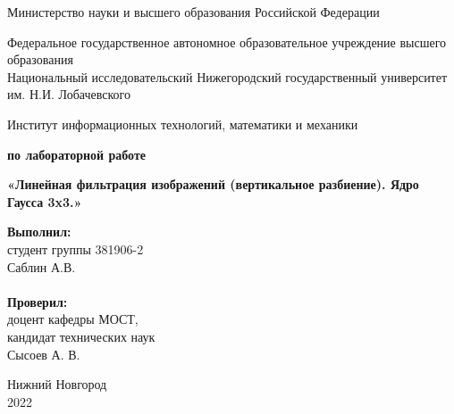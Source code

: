 \documentclass{report}
\begin{document}
\begin{titlepage}

\begin{center}
Министерство науки и высшего образования Российской Федерации
\end{center}

\begin{center}
Федеральное государственное автономное образовательное учреждение высшего образования \\
Национальный исследовательский Нижегородский государственный университет им. Н.И. Лобачевского
\end{center}

\begin{center}
Институт информационных технологий, математики и механики
\end{center}

\vspace{4em}

\begin{center}
\textbf{ по лабораторной работе} \\
\end{center}
\begin{center}
\textbf{\Large«Линейная фильтрация изображений (вертикальное разбиение). Ядро Гаусса 3x3.»} \\
\end{center}

\vspace{4em}

\newbox{\lbox}
\newlength{\maxl}
\setlength{\maxl}{\wd\lbox}
\hfill\parbox{7cm}{
\hspace*{5cm}\hspace*{-5cm}\textbf{Выполнил:} \\ студент группы 381906-2 \\ Саблин А.В.\\
\\
\hspace*{5cm}\hspace*{-5cm}\textbf{Проверил:}\\ доцент кафедры МОСТ, \\ кандидат технических наук \\ Сысоев А. В.\\}
\vspace{\fill}

\begin{center} Нижний Новгород \\ 2022 \end{center}

\end{titlepage}
\end{document}
